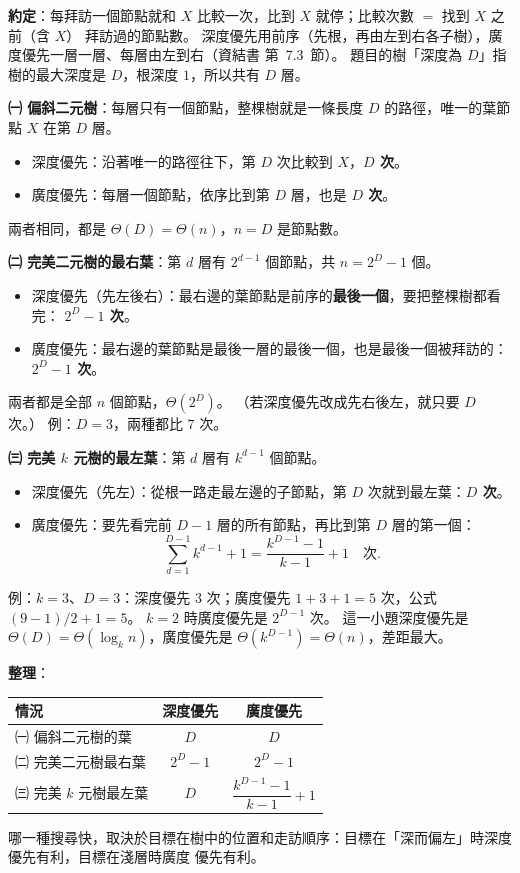 \begin{pastsoln}
\textbf{約定}：每拜訪一個節點就和 $X$ 比較一次，比到 $X$ 就停；比較次數 $=$ 找到 $X$ 之前（含 $X$）
拜訪過的節點數。 深度優先用前序（先根，再由左到右各子樹），廣度優先一層一層、每層由左到右（資結書
第~7.3~節）。 題目的樹「深度為 $D$」指樹的最大深度是 $D$，根深度 $1$，所以共有 $D$ 層。

\textbf{㈠ 偏斜二元樹}：每層只有一個節點，整棵樹就是一條長度 $D$ 的路徑，唯一的葉節點 $X$ 在第 $D$ 層。
\begin{itemize}[nosep]
\item 深度優先：沿著唯一的路徑往下，第 $D$ 次比較到 $X$，\textbf{$D$ 次}。
\item 廣度優先：每層一個節點，依序比到第 $D$ 層，也是 \textbf{$D$ 次}。
\end{itemize}
兩者相同，都是 $\Theta(D) = \Theta(n)$，$n = D$ 是節點數。

\textbf{㈡ 完美二元樹的最右葉}：第 $d$ 層有 $2^{d-1}$ 個節點，共 $n = 2^D - 1$ 個。
\begin{itemize}[nosep]
\item 深度優先（先左後右）：最右邊的葉節點是前序的\textbf{最後一個}，要把整棵樹都看完：
\textbf{$2^D - 1$ 次}。
\item 廣度優先：最右邊的葉節點是最後一層的最後一個，也是最後一個被拜訪的：\textbf{$2^D - 1$ 次}。
\end{itemize}
兩者都是全部 $n$ 個節點，$\Theta(2^D)$。 （若深度優先改成先右後左，就只要 $D$ 次。）
例：$D = 3$，兩種都比 $7$ 次。

\textbf{㈢ 完美 $k$ 元樹的最左葉}：第 $d$ 層有 $k^{d-1}$ 個節點。
\begin{itemize}[nosep]
\item 深度優先（先左）：從根一路走最左邊的子節點，第 $D$ 次就到最左葉：\textbf{$D$ 次}。
\item 廣度優先：要先看完前 $D - 1$ 層的所有節點，再比到第 $D$ 層的第一個：
\[
\sum_{d=1}^{D-1} k^{d-1} + 1 = \frac{k^{D-1} - 1}{k - 1} + 1 \quad \text{次}.
\]
\end{itemize}
例：$k = 3$、$D = 3$：深度優先 $3$ 次；廣度優先 $1 + 3 + 1 = 5$ 次，公式 $(9 - 1)/2 + 1 = 5$。 $k = 2$
時廣度優先是 $2^{D-1}$ 次。 這一小題深度優先是 $\Theta(D) = \Theta(\log_k n)$，廣度優先是
$\Theta(k^{D-1}) = \Theta(n)$，差距最大。

\textbf{整理}：
\begin{center}
\begin{tabular}{lcc}
\toprule
情況 & 深度優先 & 廣度優先 \\
\midrule
㈠ 偏斜二元樹的葉 & $D$ & $D$ \\
㈡ 完美二元樹最右葉 & $2^D - 1$ & $2^D - 1$ \\
㈢ 完美 $k$ 元樹最左葉 & $D$ & $\dfrac{k^{D-1} - 1}{k - 1} + 1$ \\
\bottomrule
\end{tabular}
\end{center}
哪一種搜尋快，取決於目標在樹中的位置和走訪順序：目標在「深而偏左」時深度優先有利，目標在淺層時廣度
優先有利。
\end{pastsoln}
